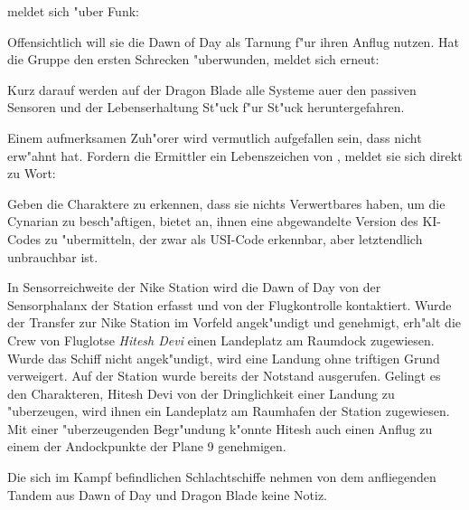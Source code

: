 \xl{} meldet sich "uber Funk:


Offensichtlich will sie die Dawn of Day als Tarnung f"ur ihren Anflug nutzen. Hat die Gruppe den ersten Schrecken "uberwunden, meldet sich \xl{} erneut:


Kurz darauf werden auf der Dragon Blade alle Systeme au\3er den passiven Sensoren und der Lebenserhaltung St"uck f"ur St"uck heruntergefahren.

Einem aufmerksamen Zuh"orer wird vermutlich aufgefallen sein, dass \xl{} \ml{} nicht erw"ahnt hat. Fordern die Ermittler ein Lebenszeichen von \ml{}, meldet sie sich direkt zu Wort:


Geben die Charaktere zu erkennen, dass sie nichts Verwertbares haben, um die Cynarian zu besch"aftigen, bietet \ml{} an, ihnen eine abgewandelte Version des KI-Codes zu "ubermitteln, der zwar als USI-Code erkennbar, aber letztendlich unbrauchbar ist.

In Sensorreichweite der Nike Station wird die Dawn of Day von der Sensorphalanx der Station erfasst und von der Flugkontrolle kontaktiert. Wurde der Transfer zur Nike Station im Vorfeld angek"undigt und genehmigt, erh"alt die Crew von Fluglotse \emph{Hitesh Devi} einen Landeplatz am Raumdock zugewiesen. Wurde das Schiff nicht angek"undigt, wird eine Landung ohne triftigen Grund verweigert. Auf der Station wurde bereits der Notstand ausgerufen. Gelingt es den Charakteren, Hitesh Devi von der Dringlichkeit einer Landung zu "uberzeugen, wird ihnen ein Landeplatz am Raumhafen der Station zugewiesen. Mit einer "uberzeugenden Begr"undung k"onnte Hitesh auch einen Anflug zu einem der Andockpunkte der Plane 9 genehmigen.

Die sich im Kampf befindlichen Schlachtschiffe nehmen von dem anfliegenden Tandem aus Dawn of Day und Dragon Blade keine Notiz.

